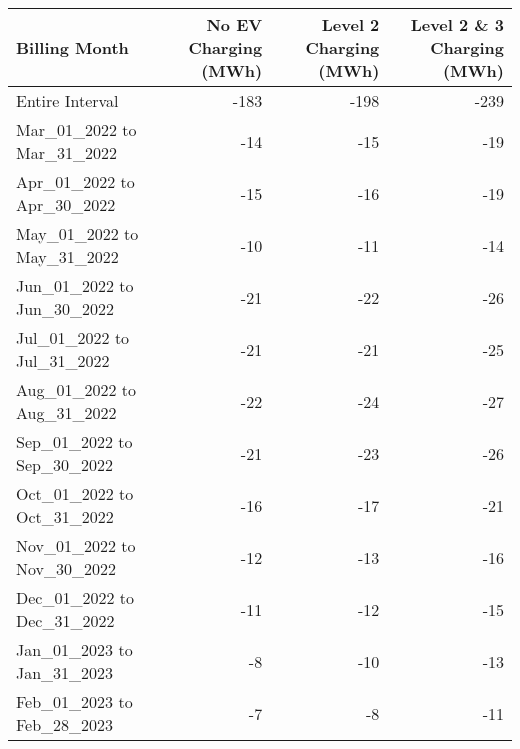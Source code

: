 \begin{tabular}{lrrr}
\toprule
             Billing Month &  No EV Charging (MWh) &  Level  2 Charging  (MWh) &  Level 2 \& 3 Charging  (MWh)\\
\midrule
           Entire Interval &        -183 &        -198 &        -239  \\
Mar\_01\_2022 to Mar\_31\_2022 &         -14 &         -15 &         -19  \\
Apr\_01\_2022 to Apr\_30\_2022 &         -15 &         -16 &         -19  \\
May\_01\_2022 to May\_31\_2022 &         -10 &         -11 &         -14  \\
Jun\_01\_2022 to Jun\_30\_2022 &         -21 &         -22 &         -26  \\
Jul\_01\_2022 to Jul\_31\_2022 &         -21 &         -21 &         -25 \\
Aug\_01\_2022 to Aug\_31\_2022 &         -22 &         -24 &         -27 \\
Sep\_01\_2022 to Sep\_30\_2022 &         -21 &         -23 &         -26\\
Oct\_01\_2022 to Oct\_31\_2022 &         -16 &         -17 &         -21  \\
Nov\_01\_2022 to Nov\_30\_2022 &         -12 &         -13 &         -16 \\
Dec\_01\_2022 to Dec\_31\_2022 &         -11 &         -12 &         -15  \\
Jan\_01\_2023 to Jan\_31\_2023 &          -8 &         -10 &         -13  \\
Feb\_01\_2023 to Feb\_28\_2023 &          -7 &          -8 &         -11 \\
\bottomrule
\end{tabular}

